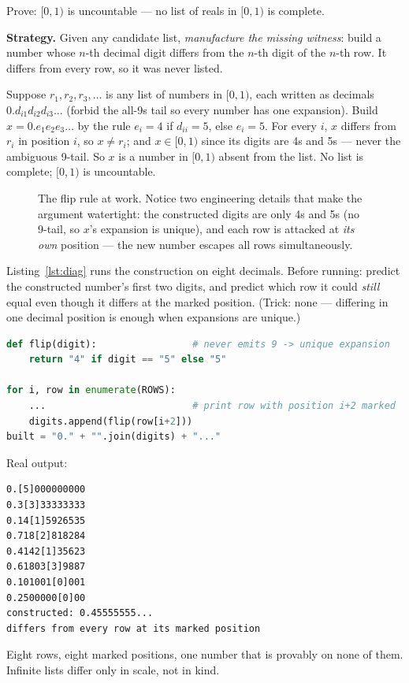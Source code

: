 \begin{example}\label{ex:cantor}
Prove: $[0,1)$ is uncountable --- no list of reals in $[0,1)$ is complete.
\par\smallskip
\textbf{Strategy.} Given any candidate list, \emph{manufacture the missing
witness}: build a number whose $n$-th decimal digit differs from the $n$-th
digit of the $n$-th row. It differs from every row, so it was never listed.
\par\smallskip
\begin{solution}
Suppose $r_1, r_2, r_3, \dots$ is any list of numbers in $[0,1)$, each written
as decimals $0.d_{i1}d_{i2}d_{i3}\dots$ (forbid the all-9s tail so every
number has one expansion). Build $x = 0.e_1e_2e_3\dots$ by the rule
$e_i = 4$ if $d_{ii} = 5$, else $e_i = 5$. For every $i$, $x$ differs from
$r_i$ in position $i$, so $x \neq r_i$; and $x \in [0,1)$ since its digits
are 4s and 5s --- never the ambiguous 9-tail. So $x$ is a number in $[0,1)$
absent from the list. No list is complete; $[0,1)$ is uncountable.
\end{solution}
\end{example}

\begin{figure}[ht]\centering

\caption{The flip rule at work. Notice two engineering details that make the
argument watertight: the constructed digits are only 4s and 5s (no 9-tail, so
$x$'s expansion is unique), and each row is attacked at \emph{its own}
position --- the new number escapes all rows simultaneously.}
\label{fig:diagonal}
\end{figure}

\begin{checkpoint}
Listing~\ref{lst:diag} runs the construction on eight decimals. Before
running: predict the constructed number's first two digits, and predict which
row it could \emph{still} equal even though it differs at the marked
position. (Trick: none --- differing in one decimal position is enough when
expansions are unique.)
\end{checkpoint}

\begin{lstlisting}[language=Python,caption={\texttt{diagonal\_demo.py}: the
manufacture-the-witness step, mechanised (full script in
\texttt{code/diagonal\_demo.py}).},label={lst:diag}]
def flip(digit):                 # never emits 9 -> unique expansion
    return "4" if digit == "5" else "5"

for i, row in enumerate(ROWS):
    ...                          # print row with position i+2 marked
    digits.append(flip(row[i+2]))
built = "0." + "".join(digits) + "..."
\end{lstlisting}
Real output:
\begin{lstlisting}[numbers=none]
0.[5]000000000
0.3[3]33333333
0.14[1]5926535
0.718[2]818284
0.4142[1]35623
0.61803[3]9887
0.101001[0]001
0.2500000[0]00
constructed: 0.45555555...
differs from every row at its marked position
\end{lstlisting}
Eight rows, eight marked positions, one number that is provably on none of
them. Infinite lists differ only in scale, not in kind.

